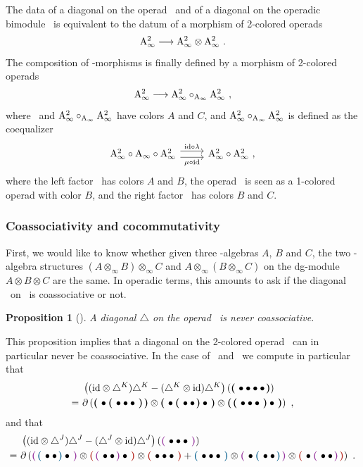 \documentclass[twoside, 12pt]{amsart}
\newtheorem{proposition}[definition]{Proposition}
\theoremstyle{remark}
\begin{document}
The data of a diagonal on the operad \Ainf\ and of a diagonal on the operadic bimodule \Minf\ is equivalent to the datum of a morphism of 2-colored operads 
\[ \mathrm{A}_\infty^2 \longrightarrow \mathrm{A}_\infty^2 \otimes \mathrm{A}_\infty^2 \ . \]
The composition of \Ainf -morphisms is finally defined by a morphism of 2-colored operads 
\[ \mathrm{A}_\infty^2 \longrightarrow \mathrm{A}_\infty^2 \circ_{\mathrm{A}_\infty} \mathrm{A}_\infty^2 \ , \]
where \Ainfdeux\ and $\mathrm{A}_\infty^2 \circ_{\mathrm{A}_\infty} \mathrm{A}_\infty^2$ have colors $A$ and $C$, and $\mathrm{A}_\infty^2 \circ_{\mathrm{A}_\infty} \mathrm{A}_\infty^2$ is defined as the coequalizer
\[ \begin{tikzcd}
\Ainfdeux \circ \Ainf \circ \Ainfdeux \ar[r,shift left=.75ex,"\ide \circ \lambda"] \ar[r,shift right=.75ex,swap,"\mu \circ \ide"] & \Ainfdeux \circ \Ainfdeux \ ,
\end{tikzcd} \]
where the left factor \Ainfdeux\ has colors $A$ and $B$, the operad \Ainf\ is seen as a 1-colored operad with color $B$, and the right factor \Ainfdeux\ has colors $B$ and $C$.


\subsubsection{Coassociativity and cocommutativity} \label{sss:coassoc-cocomm}

First, we would like to know whether given three \Ainf -algebras $A$, $B$ and $C$, the two \Ainf -algebra structures $( A \otimes_\infty B) \otimes_\infty C$ and $A \otimes_\infty ( B \otimes_\infty C)$ on the dg-module $A \otimes B \otimes C$ are the same. In operadic terms, this amounts to ask if the diagonal \diagainf\ on \Ainf\ is coassociative or not. 

\begin{proposition}[{\cite[Theorem 13]{MarklShnider06}}] \label{prop:pas-coassoc}
  \label{prop:nocoassoc}
  A diagonal $\triangle$ on the operad \Ainf\ is never coassociative.  
\end{proposition} 

This proposition implies that a diagonal on the 2-colored operad \Ainfdeux\ can in particular never be coassociative.
In the case of \diagainf\ and \diagminf\ we compute in particular that
  \begin{align*}
      &\left( (\mathrm{id} \otimes \triangle^{K} ) \triangle^{K} - (\triangle^{K} \otimes \mathrm{id}) \triangle^{K} \right) \left( \boldsymbol{\left(\right.}  \bullet \bullet \bullet \bullet  \boldsymbol{\left.\right)} \right)  \\
      = \  &\partial \left( \boldsymbol{\left(\right.}  \bullet \boldsymbol{\left(\right.}  \bullet \bullet \bullet  \boldsymbol{\left.\right)}  \boldsymbol{\left.\right)} \otimes \boldsymbol{\left(\right.}  \bullet \boldsymbol{\left(\right.}  \bullet \bullet  \boldsymbol{\left.\right)} \bullet  \boldsymbol{\left.\right)} \otimes \boldsymbol{\left(\right.}  \boldsymbol{\left(\right.}  \bullet \bullet \bullet  \boldsymbol{\left.\right)} \bullet  \boldsymbol{\left.\right)}  \right) \ ,
  \end{align*}
and that 
\begin{align*}
      &\left( (\ide \otimes \diagminf ) \diagminf - (\diagminf \otimes \ide) \diagminf \right) \left( \purple{\bullet \bullet \bullet} \right)  \\
      = \ &\partial \left(
  \purple{\blue{\bullet \bullet} \bullet} \otimes \red{\purple{\bullet \bullet} \bullet} \otimes \red{\bullet \bullet \bullet}
  + \blue{\bullet \bullet \bullet} \otimes \purple{ \bullet \blue{\bullet \bullet}} \otimes \red{\bullet \purple{\bullet \bullet}}
  \right) \ .
\end{align*} 
  
\end{document}
